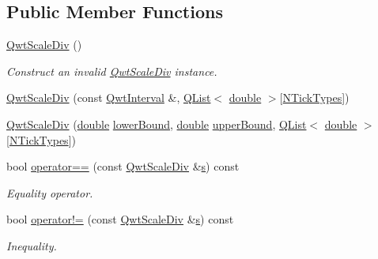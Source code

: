 \subsection*{Public Member Functions}
\begin{DoxyCompactItemize}
\item 
\hyperlink{class_qwt_scale_div_ae986a8a451440876b60db561457c952f}{Qwt\-Scale\-Div} ()
\begin{DoxyCompactList}\small\item\em Construct an invalid \hyperlink{class_qwt_scale_div}{Qwt\-Scale\-Div} instance. \end{DoxyCompactList}\item 
\hyperlink{class_qwt_scale_div_abdc25d9fe6b2efdd76a60f363a7c719c}{Qwt\-Scale\-Div} (const \hyperlink{class_qwt_interval}{Qwt\-Interval} \&, \hyperlink{class_q_list}{Q\-List}$<$ \hyperlink{_super_l_u_support_8h_a8956b2b9f49bf918deed98379d159ca7}{double} $>$\mbox{[}\hyperlink{class_qwt_scale_div_af21aedaa886dd5e067cf63505838736ca86796bbf72d5eb7162a924ba27ce6553}{N\-Tick\-Types}\mbox{]})
\item 
\hyperlink{class_qwt_scale_div_a7326c0f401dee07c2a2661166daf24ae}{Qwt\-Scale\-Div} (\hyperlink{_super_l_u_support_8h_a8956b2b9f49bf918deed98379d159ca7}{double} \hyperlink{class_qwt_scale_div_a7b9b339170625553fbb488c7877372d0}{lower\-Bound}, \hyperlink{_super_l_u_support_8h_a8956b2b9f49bf918deed98379d159ca7}{double} \hyperlink{class_qwt_scale_div_af314ab8ccdf18dec6642c1700687b48d}{upper\-Bound}, \hyperlink{class_q_list}{Q\-List}$<$ \hyperlink{_super_l_u_support_8h_a8956b2b9f49bf918deed98379d159ca7}{double} $>$\mbox{[}\hyperlink{class_qwt_scale_div_af21aedaa886dd5e067cf63505838736ca86796bbf72d5eb7162a924ba27ce6553}{N\-Tick\-Types}\mbox{]})
\item 
bool \hyperlink{class_qwt_scale_div_a459952c4cb539bcd3719df5e5765e509}{operator==} (const \hyperlink{class_qwt_scale_div}{Qwt\-Scale\-Div} \&\hyperlink{glext_8h_ad585a1393cfa368fa9dc3d8ebff640d5}{s}) const 
\begin{DoxyCompactList}\small\item\em Equality operator. \end{DoxyCompactList}\item 
bool \hyperlink{class_qwt_scale_div_a231959412880b1994b03c59537a6dea1}{operator!=} (const \hyperlink{class_qwt_scale_div}{Qwt\-Scale\-Div} \&\hyperlink{glext_8h_ad585a1393cfa368fa9dc3d8ebff640d5}{s}) const 
\begin{DoxyCompactList}\small\item\em Inequality. \end{DoxyCompactList}\item 

\end{DoxyCompactItemize}
